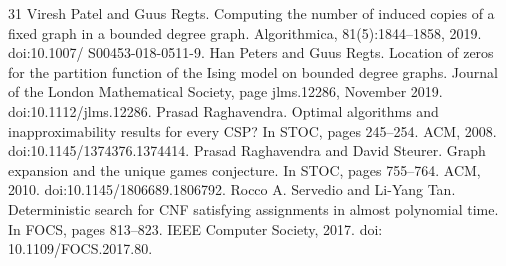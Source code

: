 \documentclass[10pt,a4paper]{article}
\theoremstyle{definition}
\begin{document}
\begin{thebibliography}{31}
Viresh Patel and Guus Regts. Computing the number of induced copies of a fixed graph in a bounded degree graph. Algorithmica, 81(5):1844–1858, 2019. doi:10.1007/ S00453-018-0511-9.
Han Peters and Guus Regts. Location of zeros for the partition function of the Ising model on bounded degree graphs. Journal of the London Mathematical Society, page jlms.12286, November 2019. doi:10.1112/jlms.12286.
Prasad Raghavendra. Optimal algorithms and inapproximability results for every CSP? In STOC, pages 245–254. ACM, 2008. doi:10.1145/1374376.1374414.
Prasad Raghavendra and David Steurer. Graph expansion and the unique games conjecture. In STOC, pages 755–764. ACM, 2010. doi:10.1145/1806689.1806792.
Rocco A. Servedio and Li-Yang Tan. Deterministic search for CNF satisfying assignments in almost polynomial time. In FOCS, pages 813–823. IEEE Computer Society, 2017. doi: 10.1109/FOCS.2017.80.
\end{thebibliography}
\end{document}
